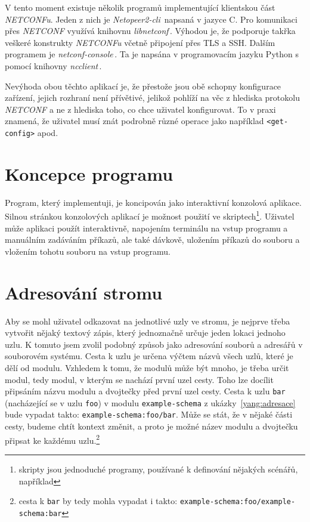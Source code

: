 \documentclass[thesis=B,czech,hidelinks]{FITthesis}[2019/03/06]
\begin{document}
V tento moment existuje několik programů implementující klientskou část \textit{NETCONFu}. Jeden z nich je \textit{Netopeer2-cli}\,\cite{netopeer} napsaná v jazyce C. Pro komunikaci přes \textit{NETCONF} využívá knihovnu \textit{libnetconf}\,\cite{libnetconf}. Výhodou je, že podporuje takřka veškeré konstrukty \textit{NETCONFu} včetně připojení přes TLS a SSH\@. Dalším programem je \textit{netconf-console}\,\cite{netconf-console}. Ta je napsána v programovacím jazyku Python s pomocí knihovny \textit{ncclient}\,\cite{ncclient}.

Nevýhoda obou těchto aplikací je, že přestože jsou obě schopny konfigurace zařízení, jejich rozhraní není přívětivé, jelikož pohlíží na věc z hlediska protokolu \textit{NETCONF} a ne z hlediska toho, co chce uživatel konfigurovat. To v praxi znamená, že uživatel musí znát podrobně různé operace jako například \texttt{<get-config>} apod. 


\section{Koncepce programu}
Program, který implementuji, je koncipován jako interaktivní konzolová aplikace. Silnou stránkou konzolových aplikací je možnost použití ve skriptech\footnote{skripty jsou jednoduché programy, používané k definování nějakých scénářů, například }. Uživatel může aplikaci použít interaktivně, napojením terminálu na vstup programu a manuálním zadáváním příkazů, ale také dávkově, uložením příkazů do souboru a vložením tohotu souboru na vstup programu.

\section{Adresování stromu}
Aby se mohl uživatel odkazovat na jednotlivé uzly ve stromu, je nejprve třeba vytvořit nějaký textový zápis, který jednoznačně určuje jeden lokaci jednoho uzlu. K tomuto jsem zvolil podobný způsob jako adresování souborů a adresářů v souborovém systému. Cesta k uzlu je určena výčtem názvů všech uzlů, které je dělí od modulu. Vzhledem k tomu, že modulů může být mnoho, je třeba určit  modul, tedy modul, v kterým se nachází první uzel cesty. Toho lze docílit připsáním názvu modulu a dvojtečky před první uzel cesty. Cesta k uzlu \texttt{bar} (nacházející se v uzlu \texttt{foo}) v modulu \texttt{example-schema} z ukázky~\ref{yang:adresace} bude vypadat takto: \texttt{example-schema:foo/bar}. Může se stát, že v nějaké části cesty, budeme chtít kontext změnit, a proto je možné název modulu a dvojtečku připsat ke každému uzlu.\footnote{cesta k \texttt{bar} by tedy mohla vypadat i takto: \texttt{example-schema:foo/example-schema:bar}}
\end{document}
